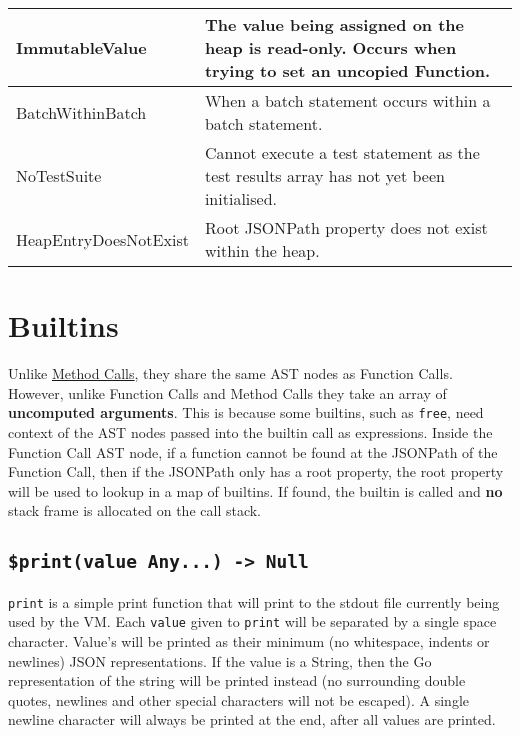 \begin{center}
    \small
    \begin{tabular}{| m{5cm} | m{5cm} |}
        \hline
        ImmutableValue & The value being assigned on the heap is read-only. Occurs when trying to set an uncopied Function.\\
        \hline
        BatchWithinBatch & When a batch statement occurs within a batch statement.\\
        \hline
        NoTestSuite & Cannot execute a test statement as the test results array has not yet been initialised.\\
        \hline
        HeapEntryDoesNotExist & Root JSONPath property does not exist within the heap.\\
        \hline
    \end{tabular}
\end{center}
\normalsize

\section{Builtins}

Unlike \hyperref[sec:method-calls]{Method Calls}, they share the same AST nodes as Function Calls. However, unlike Function Calls and Method Calls they take an array of \textbf{uncomputed arguments}. This is because some builtins, such as \verb|free|, need context of the AST nodes passed into the builtin call as expressions. Inside the Function Call AST node, if a function cannot be found at the JSONPath of the Function Call, then if the JSONPath only has a root property, the root property will be used to lookup in a map of builtins. If found, the builtin is called and \textbf{no} stack frame is allocated on the call stack.

\cprotect\subsection{\verb|$print(value Any...) -> Null|}

\verb|print| is a simple print function that will print to the stdout file currently being used by the VM. Each \verb|value| given to \verb|print| will be separated by a single space character. Value's will be printed as their minimum (no whitespace, indents or newlines) JSON representations. If the value is a String, then the Go representation of the string will be printed instead (no surrounding double quotes, newlines and other special characters will not be escaped). A single newline character will always be printed at the end, after all values are printed.

